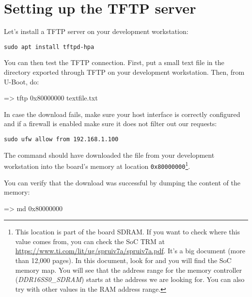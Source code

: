 \section{Setting up the TFTP server}

Let's install a TFTP server on your development workstation:

\begin{verbatim}
sudo apt install tftpd-hpa
\end{verbatim}

You can then test the TFTP connection. First, put a small text file in
the directory exported through TFTP on your development
workstation. Then, from U-Boot, do:

\begin{ubootinput}
=> tftp 0x80000000 textfile.txt
\end{ubootinput}

In case the download fails, make sure your host interface is correctly
configured and if a firewall is enabled make sure it does not filter out our
requests:
\begin{verbatim}
sudo ufw allow from 192.168.1.100
\end{verbatim}

The  command should have downloaded the
 file from your development workstation into
the board's memory at location {\tt 0x80000000}\footnote{
This location is part of the board SDRAM. If you want
to check where this value comes from, you can check the SoC
TRM at
\url{https://www.ti.com/lit/ug/spruiv7a/spruiv7a.pdf}.
It's a big document (more than 12,000 pages). In this document, look
for  and you will find the SoC memory map.
You will see that the address range for the memory controller
({\em DDR16SS0\_SDRAM})
starts at the address we are looking for.
You can also try with other values in the RAM address range.}.

You can verify that the download was successful by dumping the
content of the memory:

\begin{ubootinput}
=> md 0x80000000
\end{ubootinput}

